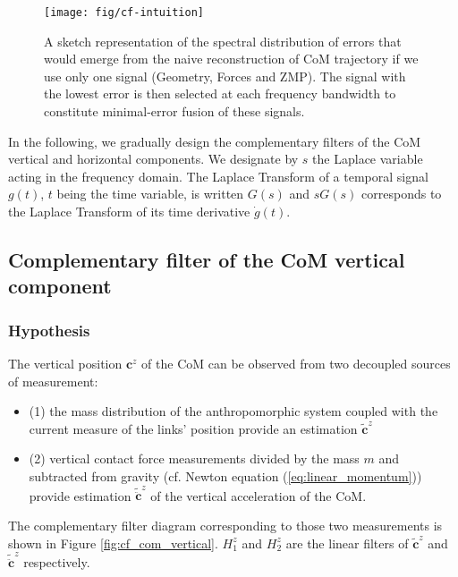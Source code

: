 \begin{figure}
\begin{center}
\texttt{[image: fig/cf-intuition]}
\caption{\label{fig:cf-intuition} A sketch representation of the spectral distribution of errors that would emerge from the naive reconstruction of CoM trajectory if we use only one signal (Geometry, Forces and ZMP). The signal with the lowest error is then selected at each frequency bandwidth to constitute minimal-error fusion of these signals.}
\end{center}
\end{figure}

In the following, we gradually design the complementary filters of the CoM vertical and horizontal components. We designate by $s$ the Laplace variable acting in the frequency domain. The Laplace Transform of a temporal signal $g(t)$, $t$  being the time variable, is written $G(s)$ and $sG(s)$ corresponds to the Laplace Transform of its time derivative $\dot{g}(t)$.

\subsection{Complementary filter of the CoM vertical component}
\label{subsec:cf_com_vertical}

\subsubsection{Hypothesis}
The vertical position $\bm c^{z}$ of the CoM can be observed from two decoupled sources of measurement:
\begin{itemize}
  \item (1) the mass distribution of the anthropomorphic system coupled with the current measure of the links' position provide an estimation $\tilde{\bm c}^z$
  \item (2)  vertical contact force measurements divided by the mass  $m$ and subtracted from gravity (cf. Newton equation (\ref{eq:linear_momentum})) provide estimation $\tilde{\ddot{\bm c}}^{z}$ of the vertical acceleration of the CoM. 
\end{itemize}
The complementary filter diagram corresponding to those two measurements is shown in Figure \ref{fig:cf_com_vertical}. $H_{1}^z$ and $H_{2}^z$ are the linear filters of $\tilde{\bm c}^{z}$ and $\tilde{\ddot{\bm c}}^{z}$ respectively.

